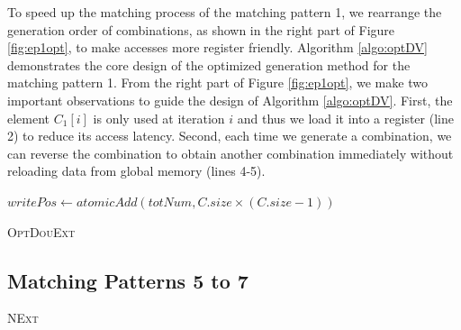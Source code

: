 To speed up the matching process of the matching pattern 1, we rearrange the generation order of combinations, as shown in the right part of Figure \ref{fig:ep1opt}, to make accesses more register friendly. Algorithm \ref{algo:optDV} demonstrates the core design of the optimized generation method for the matching pattern 1. From the right part of Figure \ref{fig:ep1opt}, we make two important observations to guide the design of Algorithm \ref{algo:optDV}. First, the element $C_1[i]$ is only used at iteration $i$ and thus we load it into a register (line 2) to reduce its access latency. Second, each time we generate a combination, we can reverse the combination to obtain another combination immediately without reloading data from global memory (lines 4-5).

\begin{algorithm}[t]
	$writePos \leftarrow atomicAdd(totNum,C.size \times (C.size-1))$\;
	\caption{\textsc{OptDouExt}}
	\label{algo:optDV}
\end{algorithm}

\subsection{Matching Patterns 5 to 7}
\begin{algorithm}[t!]
	\caption{\textsc{NExt}}
	\label{algo:nvext}
\end{algorithm}

